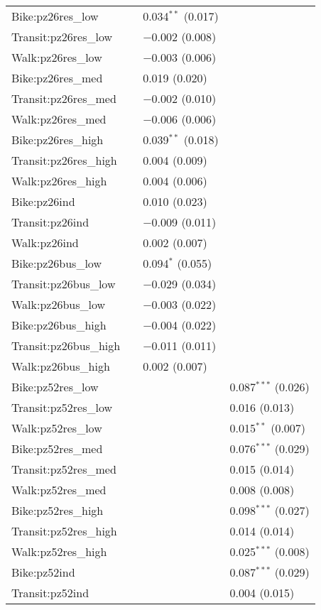 \begin{longtabu}{llll}
  Bike:pz26res\_low &  & 0.034$^{**}$ (0.017) &  \\ 
  Transit:pz26res\_low &  & $-$0.002 (0.008) &  \\ 
  Walk:pz26res\_low &  & $-$0.003 (0.006) &  \\ 
  Bike:pz26res\_med &  & 0.019 (0.020) &  \\ 
  Transit:pz26res\_med &  & $-$0.002 (0.010) &  \\ 
  Walk:pz26res\_med &  & $-$0.006 (0.006) &  \\ 
  Bike:pz26res\_high &  & 0.039$^{**}$ (0.018) &  \\ 
  Transit:pz26res\_high &  & 0.004 (0.009) &  \\ 
  Walk:pz26res\_high &  & 0.004 (0.006) &  \\ 
  Bike:pz26ind &  & 0.010 (0.023) &  \\ 
  Transit:pz26ind &  & $-$0.009 (0.011) &  \\ 
  Walk:pz26ind &  & 0.002 (0.007) &  \\ 
  Bike:pz26bus\_low &  & 0.094$^{*}$ (0.055) &  \\ 
  Transit:pz26bus\_low &  & $-$0.029 (0.034) &  \\ 
  Walk:pz26bus\_low &  & $-$0.003 (0.022) &  \\ 
  Bike:pz26bus\_high &  & $-$0.004 (0.022) &  \\ 
  Transit:pz26bus\_high &  & $-$0.011 (0.011) &  \\ 
  Walk:pz26bus\_high &  & 0.002 (0.007) &  \\ 
  Bike:pz52res\_low &  &  & 0.087$^{***}$ (0.026) \\ 
  Transit:pz52res\_low &  &  & 0.016 (0.013) \\ 
  Walk:pz52res\_low &  &  & 0.015$^{**}$ (0.007) \\ 
  Bike:pz52res\_med &  &  & 0.076$^{***}$ (0.029) \\ 
  Transit:pz52res\_med &  &  & 0.015 (0.014) \\ 
  Walk:pz52res\_med &  &  & 0.008 (0.008) \\ 
  Bike:pz52res\_high &  &  & 0.098$^{***}$ (0.027) \\ 
  Transit:pz52res\_high &  &  & 0.014 (0.014) \\ 
  Walk:pz52res\_high &  &  & 0.025$^{***}$ (0.008) \\ 
  Bike:pz52ind &  &  & 0.087$^{***}$ (0.029) \\ 
  Transit:pz52ind &  &  & 0.004 (0.015) \\ 

\end{longtabu}
